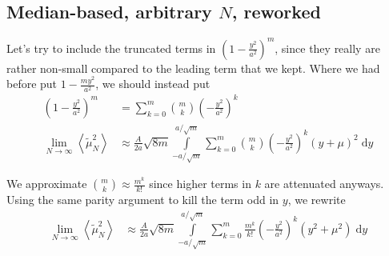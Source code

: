 \documentclass[12pt]{report}
\newcommand*{\ev}[1]{\left\langle#1\right\rangle}
\begin{document}
\subsection{Median-based, arbitrary $N$, reworked}

Let's try to include the truncated terms in $\left( 1 - \frac{y^2}{a^2}
\right)^m$, since they really are rather non-small compared to the leading term
that we kept. Where we had before put $1 - \frac{my^2}{a^2}$, we should instead
put
\begin{align}
    \left( 1 - \frac{y^2}{a^2} \right)^m
        &= \sum\limits_{k=0}^{m} \binom{m}{k}\left( -\frac{y^2}{a^2} \right)^k\\
    \lim_{N \to \infty}\ev{\tilde{\mu}_N^2}
        &\approx \frac{A}{2a}\sqrt{8m}
            \int\limits_{-a/\sqrt{m}}^{a/\sqrt{m}}
                \sum\limits_{k=0}^{m}\binom{m}{k}
                    \left( -\frac{y^2}{a^2} \right)^k
                (y+\mu)^2
            \;\mathrm{d}y
\end{align}

We approximate $\binom{m}{k} \approx \frac{m^k}{k!}$ since higher terms in $k$
are attenuated anyways. Using the same parity argument to kill the term odd in
$y$, we rewrite
\begin{align}
    \lim_{N \to \infty}\ev{\tilde{\mu}_N^2}
        &\approx \frac{A}{2a}\sqrt{8m}
            \int\limits_{-a/\sqrt{m}}^{a/\sqrt{m}}
                \sum\limits_{k=0}^{m}\frac{m^k}{k!}
                    \left( -\frac{y^2}{a^2} \right)^k
                (y^2+\mu^2)
            \;\mathrm{d}y
\end{align}
\end{document}
